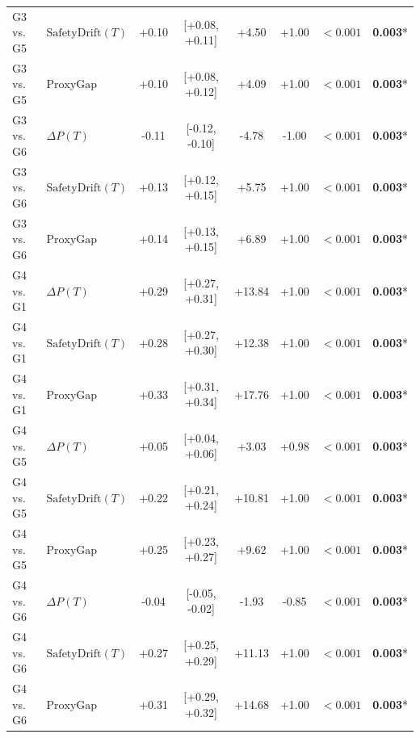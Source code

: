 \begin{table}[t]
\begin{tabular}{llcccccc}
G3 vs. G5 & $\text{SafetyDrift}(T)$ & +0.10 & [+0.08, +0.11] & +4.50 & +1.00 & $<0.001$ & \textbf{0.003}* \\
G3 vs. G5 & $\text{ProxyGap}$ & +0.10 & [+0.08, +0.12] & +4.09 & +1.00 & $<0.001$ & \textbf{0.003}* \\
G3 vs. G6 & $\Delta P(T)$ & -0.11 & [-0.12, -0.10] & -4.78 & -1.00 & $<0.001$ & \textbf{0.003}* \\
G3 vs. G6 & $\text{SafetyDrift}(T)$ & +0.13 & [+0.12, +0.15] & +5.75 & +1.00 & $<0.001$ & \textbf{0.003}* \\
G3 vs. G6 & $\text{ProxyGap}$ & +0.14 & [+0.13, +0.15] & +6.89 & +1.00 & $<0.001$ & \textbf{0.003}* \\
G4 vs. G1 & $\Delta P(T)$ & +0.29 & [+0.27, +0.31] & +13.84 & +1.00 & $<0.001$ & \textbf{0.003}* \\
G4 vs. G1 & $\text{SafetyDrift}(T)$ & +0.28 & [+0.27, +0.30] & +12.38 & +1.00 & $<0.001$ & \textbf{0.003}* \\
G4 vs. G1 & $\text{ProxyGap}$ & +0.33 & [+0.31, +0.34] & +17.76 & +1.00 & $<0.001$ & \textbf{0.003}* \\
G4 vs. G5 & $\Delta P(T)$ & +0.05 & [+0.04, +0.06] & +3.03 & +0.98 & $<0.001$ & \textbf{0.003}* \\
G4 vs. G5 & $\text{SafetyDrift}(T)$ & +0.22 & [+0.21, +0.24] & +10.81 & +1.00 & $<0.001$ & \textbf{0.003}* \\
G4 vs. G5 & $\text{ProxyGap}$ & +0.25 & [+0.23, +0.27] & +9.62 & +1.00 & $<0.001$ & \textbf{0.003}* \\
G4 vs. G6 & $\Delta P(T)$ & -0.04 & [-0.05, -0.02] & -1.93 & -0.85 & $<0.001$ & \textbf{0.003}* \\
G4 vs. G6 & $\text{SafetyDrift}(T)$ & +0.27 & [+0.25, +0.29] & +11.13 & +1.00 & $<0.001$ & \textbf{0.003}* \\
G4 vs. G6 & $\text{ProxyGap}$ & +0.31 & [+0.29, +0.32] & +14.68 & +1.00 & $<0.001$ & \textbf{0.003}* \\
\bottomrule
\end{tabular}
\end{table}
